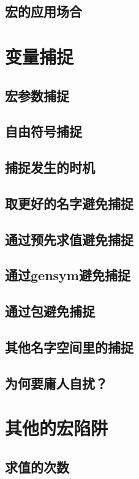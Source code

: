 \documentclass{ctexart}
\begin{document}
\subsection{宏的应用场合}
\label{sec-8-3}
\section{变量捕捉}
\label{sec-9}
\subsection{宏参数捕捉}
\label{sec-9-1}
\subsection{自由符号捕捉}
\label{sec-9-2}
\subsection{捕捉发生的时机}
\label{sec-9-3}
\subsection{取更好的名字避免捕捉}
\label{sec-9-4}
\subsection{通过预先求值避免捕捉}
\label{sec-9-5}
\subsection{通过gensym避免捕捉}
\label{sec-9-6}
\subsection{通过包避免捕捉}
\label{sec-9-7}
\subsection{其他名字空间里的捕捉}
\label{sec-9-8}
\subsection{为何要庸人自扰？}
\label{sec-9-9}
\section{其他的宏陷阱}
\label{sec-10}
\subsection{求值的次数}
\label{sec-10-1}
\end{document}
